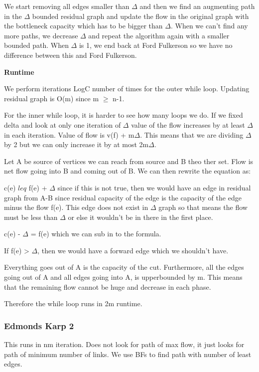 \documentclass[11pt, oneside]{article}
\theoremstyle{definition}
\begin{document}
We start removing all edges smaller than $\Delta$ and then we find an augmenting path in the $\Delta$ bounded residual graph and update the flow in the original graph with the bottleneck capacity which has to be bigger than $\Delta$. When we can't find any more paths, we decrease $\Delta$ and repeat the algorithm again with a smaller bounded path. When $\Delta$ is 1, we end back at Ford Fulkerson so we have no difference between this and Ford Fulkerson.

\textbf{Runtime}


We perform iterations LogC number of times for the outer while loop. Updating residual graph is O(m) since m $\geq$ n-1.

For the inner while loop, it is harder to see how many loops we do. If we fixed delta and look at only one iteration of $\Delta$ value of the flow increases by at least $\Delta$ in each iteration. Value of flow is v(f) + m$\Delta$. This means that we are dividing $\Delta$ by 2 but we can only increase it by at most 2m$\Delta$.

Let A be source of vertices we can reach from source and B theo ther set. Flow is net flow going into B and coming out of B. We can then rewrite the equation as:

c(e) $leq$ f(e) + $\Delta$ since if this is not true, then we would have an edge in residual graph from A-B since residual capacity of the edge is the capacity of the edge minus the flow f(e). This edge does not exist in $\Delta$ graph so that means the flow must be less than $\Delta$ or else it wouldn't be in there in the first place.

c(e) - $\Delta$ = f(e) which we can sub in to the formula.

If f(e) > $\Delta$, then we would have a forward edge which we shouldn't have.

Everything goes out of A is the capacity of the cut. Furthermore, all the edges going out of A and all edges going into A, is upperbounded by m. This means that the remaining flow cannot be huge and decrease in each phase.

Therefore the while loop runs in 2m runtime.


\subsubsection{Edmonds Karp 2}
This runs in nm iteration. Does not look for path of max flow, it just looks for path of minimum number of links. We use BFs to find path with number of least edges.
\end{document}
